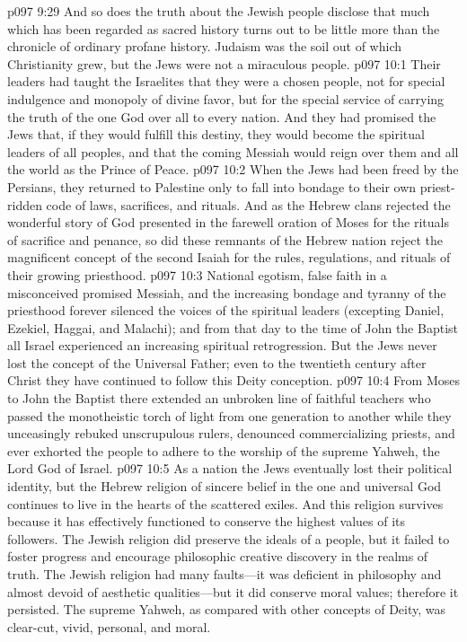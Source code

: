 \pc \vs p097 9:29 And so does the truth about the Jewish people disclose that much which has been regarded as sacred history turns out to be little more than the chronicle of ordinary profane history. Judaism was the soil out of which Christianity grew, but the Jews were not a miraculous people.
\vs p097 10:1 Their leaders had taught the Israelites that they were a chosen people, not for special indulgence and monopoly of divine favor, but for the special service of carrying the truth of the one God over all to every nation. And they had promised the Jews that, if they would fulfill this destiny, they would become the spiritual leaders of all peoples, and that the coming Messiah would reign over them and all the world as the Prince of Peace.\plusone
\vs p097 10:2 When the Jews had been freed by the Persians, they returned to Palestine only to fall into bondage to their own priest\hyp{}ridden code of laws, sacrifices, and rituals. And as the Hebrew clans rejected the wonderful story of God presented in the farewell oration of Moses for the rituals of sacrifice and penance, so did these remnants of the Hebrew nation reject the magnificent concept of the second Isaiah for the rules, regulations, and rituals of their growing priesthood.
\vs p097 10:3 National egotism, false faith in a misconceived promised Messiah, and the increasing bondage and tyranny of the priesthood forever silenced the voices of the spiritual leaders (excepting Daniel, Ezekiel, Haggai, and Malachi); and from that day to the time of John the Baptist all Israel experienced an increasing spiritual retrogression. But the Jews never lost the concept of the Universal Father; even to the twentieth century after Christ they have continued to follow this Deity conception.
\vs p097 10:4 From Moses to John the Baptist there extended an unbroken line of faithful teachers who passed the monotheistic torch of light from one generation to another while they unceasingly rebuked unscrupulous rulers, denounced commercializing priests, and ever exhorted the people to adhere to the worship of the supreme Yahweh, the Lord God of Israel.
\pc \vs p097 10:5 As a nation the Jews eventually lost their political identity, but the Hebrew religion of sincere belief in the one and universal God continues to live in the hearts of the scattered exiles. And this religion survives because it has effectively functioned to conserve the highest values of its followers. The Jewish religion did preserve the ideals of a people, but it failed to foster progress and encourage philosophic creative discovery in the realms of truth. The Jewish religion had many faults---it was deficient in philosophy and almost devoid of aesthetic qualities---but it did conserve moral values; therefore it persisted. The supreme Yahweh, as compared with other concepts of Deity, was clear\hyp{}cut, vivid, personal, and moral.\plusone
